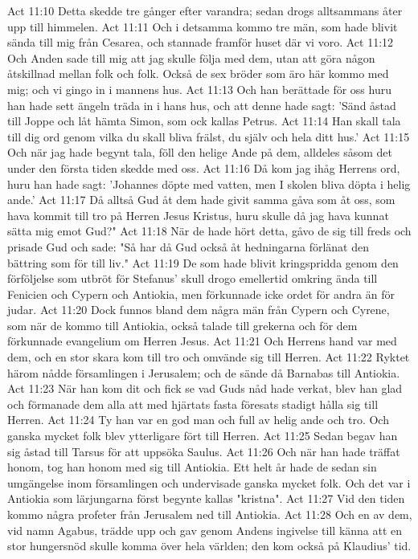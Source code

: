 Act 11:10  Detta skedde tre gånger efter varandra; sedan drogs alltsammans åter upp till himmelen.
Act 11:11  Och i detsamma kommo tre män, som hade blivit sända till mig från Cesarea, och stannade framför huset där vi voro.
Act 11:12  Och Anden sade till mig att jag skulle följa med dem, utan att göra någon åtskillnad mellan folk och folk. Också de sex bröder som äro här kommo med mig; och vi gingo in i mannens hus.
Act 11:13  Och han berättade för oss huru han hade sett ängeln träda in i hans hus, och att denne hade sagt: 'Sänd åstad till Joppe och låt hämta Simon, som ock kallas Petrus.
Act 11:14  Han skall tala till dig ord genom vilka du skall bliva frälst, du själv och hela ditt hus.'
Act 11:15  Och när jag hade begynt tala, föll den helige Ande på dem, alldeles såsom det under den första tiden skedde med oss.
Act 11:16  Då kom jag ihåg Herrens ord, huru han hade sagt: 'Johannes döpte med vatten, men I skolen bliva döpta i helig ande.'
Act 11:17  Då alltså Gud åt dem hade givit samma gåva som åt oss, som hava kommit till tro på Herren Jesus Kristus, huru skulle då jag hava kunnat sätta mig emot Gud?"
Act 11:18  När de hade hört detta, gåvo de sig till freds och prisade Gud och sade: "Så har då Gud också åt hedningarna förlänat den bättring som för till liv."
Act 11:19  De som hade blivit kringspridda genom den förföljelse som utbröt för Stefanus' skull drogo emellertid omkring ända till Fenicien och Cypern och Antiokia, men förkunnade icke ordet för andra än för judar.
Act 11:20  Dock funnos bland dem några män från Cypern och Cyrene, som när de kommo till Antiokia, också talade till grekerna och för dem förkunnade evangelium om Herren Jesus.
Act 11:21  Och Herrens hand var med dem, och en stor skara kom till tro och omvände sig till Herren.
Act 11:22  Ryktet härom nådde församlingen i Jerusalem; och de sände då Barnabas till Antiokia.
Act 11:23  När han kom dit och fick se vad Guds nåd hade verkat, blev han glad och förmanade dem alla att med hjärtats fasta föresats stadigt hålla sig till Herren.
Act 11:24  Ty han var en god man och full av helig ande och tro. Och ganska mycket folk blev ytterligare fört till Herren.
Act 11:25  Sedan begav han sig åstad till Tarsus för att uppsöka Saulus.
Act 11:26  Och när han hade träffat honom, tog han honom med sig till Antiokia. Ett helt år hade de sedan sin umgängelse inom församlingen och undervisade ganska mycket folk. Och det var i Antiokia som lärjungarna först begynte kallas "kristna".
Act 11:27  Vid den tiden kommo några profeter från Jerusalem ned till Antiokia.
Act 11:28  Och en av dem, vid namn Agabus, trädde upp och gav genom Andens ingivelse till känna att en stor hungersnöd skulle komma över hela världen; den kom också på Klaudius' tid.
